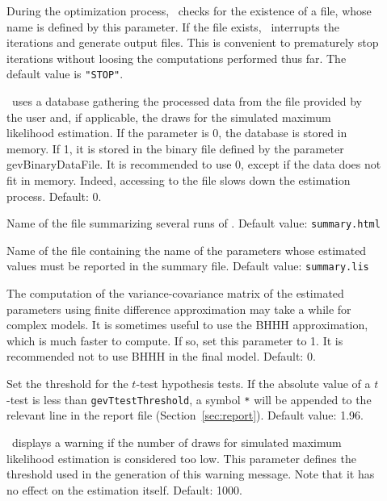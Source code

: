 \documentclass[12pt]{memoir}
\begin{document}
\begin{description}
\begin{description}
      \item[] During the optimization process, \BIOGEME\ checks for the 
         existence of a file, whose name is defined by this parameter. If the file exists, \BIOGEME\ 
         interrupts the iterations and generate output files. This is convenient to prematurely stop 
         iterations without loosing the computations performed thus far. The default value is \verb+"STOP"+.

      \item[] \BIOGEME\ uses a database
         gathering the processed data from the file provided by the user
         and, if applicable, the draws for the simulated maximum likelihood
         estimation. If the parameter is 0, the database is stored in
         memory. If 1, it is stored in the binary file
         defined by the parameter gevBinaryDataFile. It is recommended to use 0, except if
         the data does not fit in  memory. Indeed, accessing to the file
         slows down the estimation process. Default: 0.

      \item[] Name of the file summarizing
         several runs of \BIOGEME. Default value: \verb+summary.html+

      \item[] Name of the file containing
        the name of the parameters whose estimated values must be reported in
        the summary file. Default value: \verb+summary.lis+


  \item[] The computation of the
variance-covariance matrix of the estimated parameters using finite difference approximation may
take a while for complex models. It is sometimes useful to use the
BHHH approximation, which is much faster to compute. If so, set this
parameter to 1. It is recommended not to use BHHH in the final
model. Default: 0.

      \item[] Set the threshold for the $t$-test
         hypothesis tests. If the absolute value of a $t$-test is less than
         \verb+gevTtestThreshold+, a symbol \verb+*+ will be appended to the relevant
         line in the report file (Section~\ref{sec:report}). Default value: 1.96.
         

\item[] \BIOGEME\ displays a warning if
  the number of draws for simulated maximum likelihood estimation is
  considered too low. This parameter defines the threshold used in the
  generation of this warning message. Note that it has no effect on
  the estimation itself. Default: 1000. 


\end{description}
\end{description}
\end{document}
